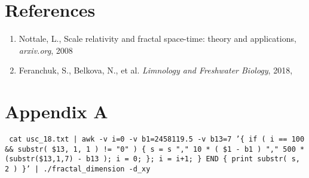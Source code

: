 \documentclass[a4paper]{article}
\begin{document}
\section*{References}

\begin{enumerate}

\item Nottale, L., Scale relativity and fractal space-time: theory and applications, \textit{arxiv.org}, 2008

\item Feranchuk, S., Belkova, N., et al. \textit{Limnology and Freshwater Biology}, 2018,

\end{enumerate}

\newpage
\section*{Appendix A}


\texttt{\small{ cat usc\_18.txt | awk -v i=0 -v b1=2458119.5 -v b13=7 '\{ if ( i == 100 \&\& substr( \$13, 1, 1 ) != "0" ) \{ s = s "," 10 * ( \$1 - b1 ) "," 500 * (substr(\$13,1,7) - b13 ); i = 0; \}; i = i+1; \} END \{ print substr( s, 2 ) \}' | ./fractal\_dimension -d\_xy }}


\end{document}
